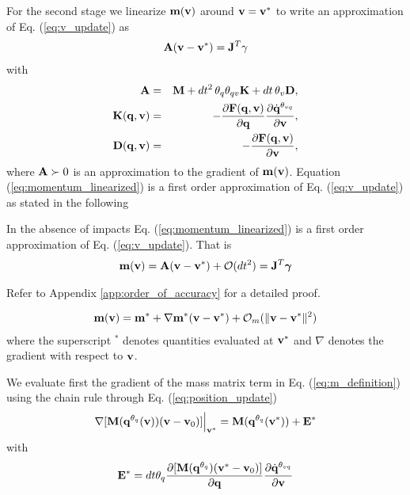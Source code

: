 For the second stage we linearize ${\mathbf{m}}({\mathbf{v}})$ around ${\mathbf{v}} = {\mathbf{v}}^*$ to write an approximation of Eq. (\ref{eq:v_update}) as
\begin{eqnarray}
	\mf{A}(\mf{v}-\mf{v}^*)= \mf{J}^T\mf{\gamma}
	\label{eq:momentum_linearized}
\end{eqnarray}
with
\begin{eqnarray}
	\mf{A}&=&\mf{M}+dt^2\,\theta_q\theta_{qv}\mf{K}+dt\,\theta_v\mf{D},
	\label{eq:expression_for_A}\\
	\mf{K}(\mf{q}, \mf{v})&=&-\frac{\partial \mf{F}(\mf{q}, \mf{v})}{\partial
	\mf{q}}\frac{\partial\dot{\mf{q}}^{\theta_{vq}}}{\partial\mf{v}},\\
		\mf{D}(\mf{q}, \mf{v})&=&-\frac{\partial \mf{F}(\mf{q},
		\mf{v})}{\partial \mf{v}},
		\label{eq:dissipation_matrix}
\end{eqnarray}
where ${\mathbf{A}} \succ 0$ is an approximation to the gradient of ${\mathbf{m}}({\mathbf{v}})$. Equation (\ref{eq:momentum_linearized}) is a first order approximation of Eq. (\ref{eq:v_update}) as stated in the following
\begin{theorem}	
	In the absence of impacts Eq. (\ref{eq:momentum_linearized}) is a first
	order approximation of Eq. (\ref{eq:v_update}). That is
	\begin{eqnarray}
		{\mathbf{m}}({\mathbf{v}}) = {\mathbf{A}}({\mathbf{v}}-{\mathbf{v}}^*) + \mathcal{O}(dt^2) =
		{\mathbf{J}}^T{\mathbf{{\bm\gamma}}}
	\end{eqnarray}
\end{theorem}
Refer to Appendix \ref{app:order_of_accuracy} for a detailed proof.


\begin{eqnarray}
	\mf{m}(\mf{v}) = \mf{m}^* +
	\nabla\mf{m}^*(\mf{v}-\mf{v}^*) + \mathcal{O}_m(\Vert\mf{v}-\mf{v}^*\Vert^2)
	\label{eq:m_taylor_expansion}
\end{eqnarray}
where the superscript $^*$ denotes quantities evaluated at ${\mathbf{v}}^*$ and
$\nabla$ denotes the gradient with respect to ${\mathbf{v}}$.

We evaluate first the gradient of the mass matrix term in Eq.
(\ref{eq:m_definition}) using the chain rule through Eq.
(\ref{eq:position_update})
\begin{eqnarray}
	\nabla[{\mathbf{M}}({\mathbf{q}}^{\theta_{q}}({\mathbf{v}}))({\mathbf{v}}-{\mathbf{v}}_0)]\Bigr|_{{\mathbf{v}}^*}
	= {\mathbf{M}}({\mathbf{q}}^{\theta_{q}}({\mathbf{v}}^*)) + {\mathbf{E}}^*
\end{eqnarray}
with
\begin{eqnarray}
	\mf{E}^* =
	dt\theta_q\frac{\partial[\mf{M}(\mf{q}^{\theta_{q}})(\mf{v}^*-\mf{v}_0)]}{\partial\mf{q}}\frac{\partial\dot{\mf{q}}^{\theta_{vq}}}{\partial\mf{v}}
	\label{eq:E_definition}
\end{eqnarray}

